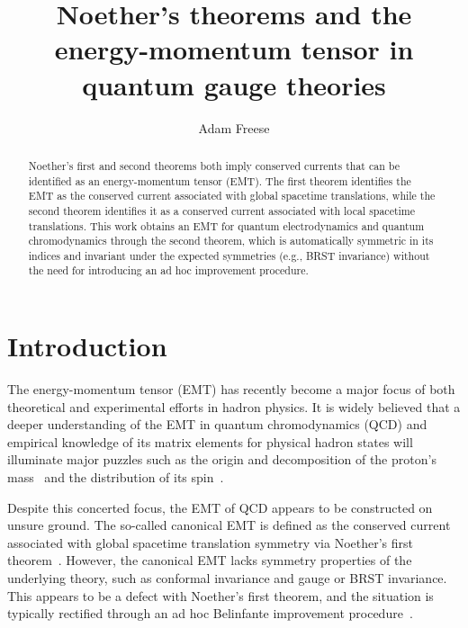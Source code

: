 \documentclass[prd,preprint,
  showpacs,showkeys,lengthcheck,
  nofootinbib,tightenlines,onecolumn,notitlepage,
  preprintnumbers,superscriptaddress]{revtex4-1}
\begin{document}
\title{Noether's theorems and the energy-momentum tensor in quantum gauge theories}

\author{Adam Freese}
\address{Department of Physics, University of Washington, Seattle, WA 98195, USA}

\begin{abstract}
  Noether's first and second theorems both imply conserved currents
  that can be identified as an energy-momentum tensor (EMT).
  The first theorem identifies the EMT as the conserved current associated
  with global spacetime translations,
  while the second theorem identifies it as a conserved current
  associated with local spacetime translations.
  This work obtains an EMT for quantum electrodynamics and quantum chromodynamics
  through the second theorem,
  which is automatically symmetric in its indices and invariant under the
  expected symmetries (e.g., BRST invariance)
  without the need for introducing an ad hoc improvement procedure.
\end{abstract}


\maketitle



\section{Introduction}
\label{sec:intro}

The energy-momentum tensor (EMT) has recently become a major focus of both
theoretical and experimental efforts in hadron physics.
It is widely believed that a deeper understanding of the EMT
in quantum chromodynamics (QCD)
and empirical knowledge of its matrix elements for physical hadron states
will illuminate major puzzles such as the origin and decomposition of the proton's
mass~\cite{Ji:1994av,Ji:1995sv,Lorce:2017xzd,Hatta:2018sqd,Metz:2020vxd,Ji:2021mtz,Lorce:2021xku}
and the distribution of its
spin~\cite{Ashman:1987hv,Jaffe:1989jz,Ji:1996ek,Leader:2013jra}.

Despite this concerted focus,
the EMT of QCD appears to be constructed on unsure ground.
The so-called canonical EMT is defined as
the conserved current associated with global spacetime translation symmetry
via Noether's first theorem~\cite{Noether:1918zz}.
However, the canonical EMT lacks symmetry properties of the underlying theory,
such as conformal invariance and gauge or BRST invariance.
This appears to be a defect with Noether's first theorem,
and the situation is typically rectified through an ad hoc
Belinfante improvement procedure~\cite{Belinfante:1939emt}.
\end{document}
